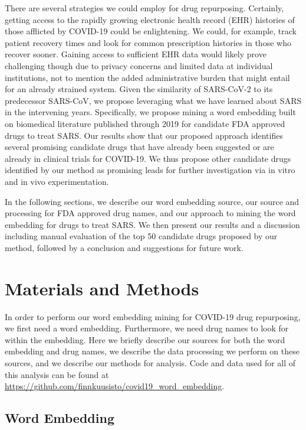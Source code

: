 \documentclass{article}
\begin{document}
There are several strategies we could employ for drug repurposing.
Certainly, getting access to the rapidly growing electronic health record (EHR) histories of those afflicted by COVID-19 could be enlightening.
We could, for example, track patient recovery times and look for common prescription histories in those who recover sooner.
Gaining access to sufficient EHR data would likely prove challenging though due to privacy concerns and limited data at individual institutions, not to mention the added administrative burden that might entail for an already strained system.
Given the similarity of SARS-CoV-2 to its predecessor SARS-CoV\cite{wu2020genome}, we propose leveraging what we have learned about SARS in the intervening years.
Specifically, we propose mining a word embedding built on biomedical literature published through 2019 for candidate FDA approved drugs to treat SARS.
Our results show that our proposed approach identifies several promising candidate drugs that have already been suggested or are already in clinical trials for COVID-19.
We thus propose other candidate drugs identified by our method as promising leads for further investigation via in vitro and in vivo experimentation.

In the following sections, we describe our word embedding source, our source and processing for FDA approved drug names, and our approach to mining the word embedding for drugs to treat SARS.
We then present our results and a discussion including manual evaluation of the top 50 candidate drugs proposed by our method, followed by a conclusion and suggestions for future work.

\section{Materials and Methods}

In order to perform our word embedding mining for COVID-19 drug repurposing, we first need a word embedding.
Furthermore, we need drug names to look for within the embedding.
Here we briefly describe our sources for both the word embedding and drug names, we describe the data processing we perform on these sources, and we describe our methods for analysis.
Code and data used for all of this analysis can be found at \url{https://github.com/finnkuusisto/covid19_word_embedding}.

\subsection{Word Embedding}
\end{document}
